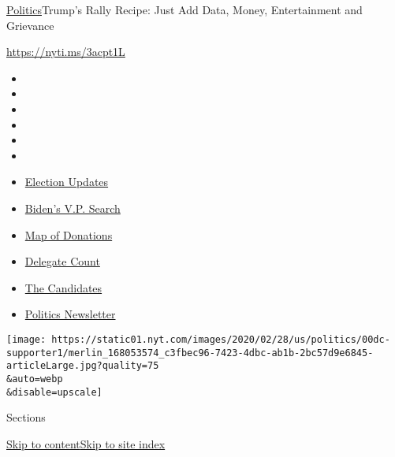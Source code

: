 \href{/section/politics}{Politics}\textbar{}Trump's Rally Recipe: Just
Add Data, Money, Entertainment and Grievance

\url{https://nyti.ms/3acpt1L}

\begin{itemize}
\item
\item
\item
\item
\item
\item
\end{itemize}

\begin{itemize}
\item
  \href{https://www.nytimes.com/2020/07/31/us/elections/biden-vs-trump.html?action=click\&pgtype=Article\&state=default\&region=TOP_BANNER\&context=storylines_menu}{Election
  Updates}
\item
  \href{https://www.nytimes.com/article/biden-vice-president-2020.html?action=click\&pgtype=Article\&state=default\&region=TOP_BANNER\&context=storylines_menu}{Biden's
  V.P. Search}
\item
  \href{https://www.nytimes.com/interactive/2020/07/24/us/politics/trump-biden-campaign-donors.html?action=click\&pgtype=Article\&state=default\&region=TOP_BANNER\&context=storylines_menu}{Map
  of Donations}
\item
  \href{https://www.nytimes.com/interactive/2020/us/elections/delegate-count-primary-results.html?action=click\&pgtype=Article\&state=default\&region=TOP_BANNER\&context=storylines_menu}{Delegate
  Count}
\item
  \href{https://www.nytimes.com/interactive/2019/us/politics/2020-presidential-candidates.html?action=click\&pgtype=Article\&state=default\&region=TOP_BANNER\&context=storylines_menu}{The
  Candidates}
\item
  \href{https://www.nytimes.com/newsletters/politics?action=click\&pgtype=Article\&state=default\&region=TOP_BANNER\&context=storylines_menu}{Politics
  Newsletter}
\end{itemize}

\texttt{[image: https://static01.nyt.com/images/2020/02/28/us/politics/00dc-supporter1/merlin\_168053574\_c3fbec96-7423-4dbc-ab1b-2bc57d9e6845-articleLarge.jpg?quality=75\\\&auto=webp\\\&disable=upscale]}

Sections

\protect\hyperlink{site-content}{Skip to
content}\protect\hyperlink{site-index}{Skip to site index}

